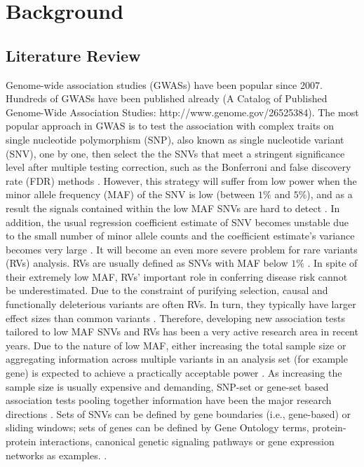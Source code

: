 \documentclass[12pt]{article}
\begin{document}
\newpage
\tableofcontents

\newpage
\listoftables

\newpage
\listoffigures
 

\newpage
\section{Background}\label{sec:background}
\subsection{Literature Review}\label{Lit_Rev}
\doublespacing
Genome-wide association studies (GWASs) have been popular since 2007. Hundreds of GWASs have been published already (A Catalog of Published Genome-Wide Association Studies: http://www.genome.gov/26525384). The most popular approach in GWAS is to test the association with complex traits on single nucleotide polymorphism (SNP), also known as single nucleotide variant (SNV), one by one, then select the the SNVs that meet a stringent significance level after multiple testing correction, such as the Bonferroni and false discovery rate (FDR) methods \cite{McCarthy2008,Hirschhorn2005}. However, this strategy will suffer from low power when the minor allele frequency (MAF) of the SNV is low (between $1\%$ and $5\%$), and as a result the signals contained within the low MAF SNVs are hard to detect \cite{Sham2014}. In addition, the usual regression coefficient estimate of SNV becomes unstable due to the small number of minor allele counts and the coefficient estimate's variance becomes very large \cite{Sham2014}. It will become an even more severe problem for rare variants (RVs) analysis. RVs are usually defined as SNVs with MAF below $1\%$ \cite{Bansal2010}. In spite of their extremely low MAF, RVs' important role in conferring disease risk cannot be underestimated. Due to the constraint of purifying selection, causal and functionally deleterious variants are often RVs. In turn, they typically have larger effect sizes than common variants \cite{Fu2013,Bansal2010,Sham2014,McCarthy2008}. Therefore, developing new association tests tailored to low MAF SNVs and RVs has been a very active research area in recent years. Due to the nature of low MAF, either increasing the total sample size or aggregating information across multiple variants in an analysis set (for example gene) is expected to achieve a practically acceptable power \cite{Capanu2011,Basu2011,Bansal2010,Sham2014}. As increasing the sample size is usually expensive and demanding, SNP-set or gene-set based association tests pooling together information have been the major research directions \cite{Ye2011,Pinto2010,Sham2014}. Sets of SNVs can be defined by gene boundaries (i.e., gene-based) or sliding windows; sets of genes can be defined by Gene Ontology terms, protein-protein interactions, canonical genetic signaling pathways or gene expression networks as examples. \cite{Sham2014,DelaCruz2010,Weng2011,Wang2010,Wei2012a}.
\end{document}

